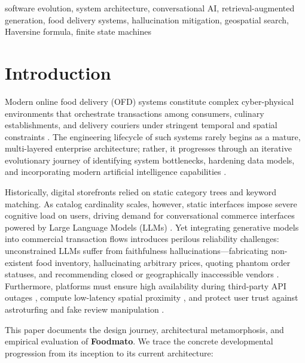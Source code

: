 \documentclass[conference]{IEEEtran}
\begin{document}
\begin{IEEEkeywords}
software evolution, system architecture, conversational AI, retrieval-augmented generation, food delivery systems, hallucination mitigation, geospatial search, Haversine formula, finite state machines
\end{IEEEkeywords}

\section{Introduction}
Modern online food delivery (OFD) systems constitute complex cyber-physical environments that orchestrate transactions among consumers, culinary establishments, and delivery couriers under stringent temporal and spatial constraints \cite{ref_market, ref_ofd_survey}. The engineering lifecycle of such systems rarely begins as a mature, multi-layered enterprise architecture; rather, it progresses through an iterative evolutionary journey of identifying system bottlenecks, hardening data models, and incorporating modern artificial intelligence capabilities \cite{ref_software_evolution}.

Historically, digital storefronts relied on static category trees and keyword matching. As catalog cardinality scales, however, static interfaces impose severe cognitive load on users, driving demand for conversational commerce interfaces powered by Large Language Models (LLMs) \cite{ref_ecomm_rag}. Yet integrating generative models into commercial transaction flows introduces perilous reliability challenges: unconstrained LLMs suffer from faithfulness hallucinations—fabricating non-existent food inventory, hallucinating arbitrary prices, quoting phantom order statuses, and recommending closed or geographically inaccessible vendors \cite{ref_huang_hallucination, ref_xu_hallucination}. Furthermore, platforms must ensure high availability during third-party API outages \cite{ref_banu_cloud}, compute low-latency spatial proximity \cite{ref_haversine_logistics}, and protect user trust against astroturfing and fake review manipulation \cite{ref_fake_reviews}.

This paper documents the design journey, architectural metamorphosis, and empirical evaluation of \textbf{Foodmato}. We trace the concrete developmental progression from its inception to its current architecture:
\end{document}
